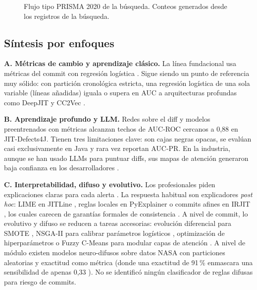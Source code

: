 \begin{figure}[!t]
\centering

\caption{Flujo tipo PRISMA 2020 de la búsqueda. Conteos generados desde los registros de la búsqueda.}
\label{fig:prisma}
\end{figure}



\subsection{Síntesis por enfoques}

\textbf{A. Métricas de cambio y aprendizaje clásico.} La línea fundacional usa métricas del commit con regresión logística \cite{Mockus2000,Kamei2013}. Sigue siendo un punto de referencia muy sólido: con partición cronológica estricta, una regresión logística de una sola variable (líneas añadidas) iguala o supera en AUC a arquitecturas profundas como DeepJIT y CC2Vec \cite{Zeng2021}.

\textbf{B. Aprendizaje profundo y LLM.} Redes sobre el diff y modelos preentrenados con métricas \cite{Ni2022} alcanzan techos de AUC-ROC cercanos a 0,88 en JIT-Defects4J. Tienen tres limitaciones clave: son cajas negras opacas, se evalúan casi exclusivamente en Java y rara vez reportan AUC-PR. En la industria, aunque se han usado LLMs para puntuar diffs, sus mapas de atención generaron baja confianza en los desarrolladores \cite{Liu2026}.

\textbf{C. Interpretabilidad, difuso y evolutivo.} Los profesionales piden explicaciones claras para cada alerta \cite{Jiarpakdee2021}. La respuesta habitual son explicadores \emph{post hoc}: LIME en JITLine \cite{JITLine2021}, reglas locales en PyExplainer \cite{PyExplainer2021} o commits afines en IRJIT \cite{Sahar2024}, los cuales carecen de garantías formales de consistencia \cite{Yu2024FoX}. A nivel de commit, lo evolutivo y difuso se reducen a tareas accesorias: evolución diferencial para SMOTE \cite{JITLine2021}, NSGA-II para calibrar parámetros logísticos \cite{Chen2018MULTI}, optimización de hiperparámetros \cite{Kang2021,Mostafa2025} o Fuzzy C-Means para modular capas de atención \cite{Chen2025}. A nivel de módulo existen modelos neuro-difusos sobre datos NASA con particiones aleatorias y exactitud como métrica \cite{Aftab2023,Dey2025} (donde una exactitud de 91\,\% enmascara una sensibilidad de apenas 0,33 \cite{Aftab2023}). No se identificó ningún clasificador de reglas difusas para riesgo de commits.

